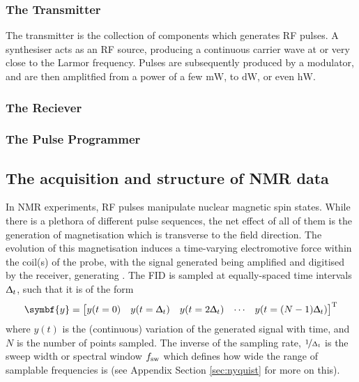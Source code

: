 \subsubsection{The Transmitter}
The transmitter is the collection of components which generates \ac{RF} pulses. A
synthesiser acts as an \ac{RF} source, producing a continuous carrier wave at or
very close to the Larmor frequency. Pulses are subsequently produced by a
modulator, and are then amplitfied from a power of a few $\si{\milli \watt}$,
to $\si{\deca \watt}$, or even $\si{\hecto \watt}$\cite{Keeler2010}.

\subsubsection{The Reciever}

\subsubsection{The Pulse Programmer}

\subsection{The acquisition and structure of \acs{NMR} data}
In \ac{NMR} experiments, \ac{RF} pulses manipulate nuclear magnetic spin
states. While there is a plethora of different pulse sequences, the net effect
of all of them is the generation of magnetisation which is transverse to the
field direction. The evolution of this magnetisation induces a time-varying
electromotive force within the coil(s) of the probe, with the signal generated
being amplified and digitised by the receiver, generating .
The \ac{FID} is sampled at equally-spaced time intervals $\Updelta_t$, such that
it is of the form
\begin{equation}
  \symbf{y} =
  \begin{bmatrix}
      y(t=0) & y(t=\Dt) & y(t=2\Dt) & \cdots & y(t=(N-1)\Dt)
  \end{bmatrix}\T
\end{equation}
where $y(t)$ is the (continuous) variation of the generated signal with time,
and $N$ is the number of points sampled. The inverse of the sampling rate,
$\nicefrac{1}{\Updelta_t}$ is the sweep width or spectral window $f_{\mathrm{sw}}$ which
defines how wide the range of samplable frequencies is (see Appendix Section
\ref{sec:nyquist} for more on this).

